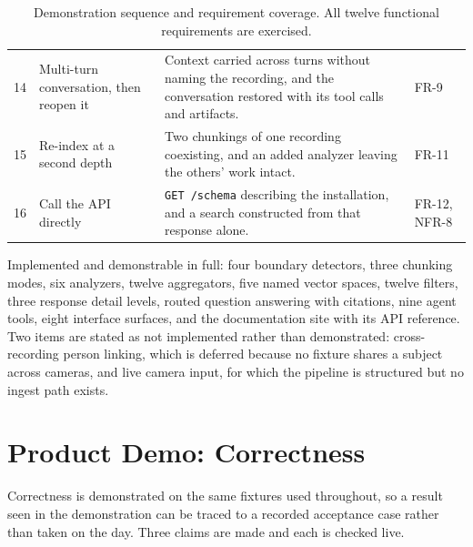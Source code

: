 \documentclass[11pt,a4paper]{article}
\begin{document}
\begin{table}[htbp]
\begin{tabularx}{\textwidth}{@{}L{0.7cm}L{3.4cm}XL{1.9cm}@{}}
14 & Multi-turn conversation, then reopen it & Context carried across turns without naming the recording, and the conversation restored with its tool calls and artifacts. & FR-9 \\
15 & Re-index at a second depth & Two chunkings of one recording coexisting, and an added analyzer leaving the others' work intact. & FR-11 \\
16 & Call the API directly & \texttt{GET /schema} describing the installation, and a search constructed from that response alone. & FR-12, NFR-8 \\
\bottomrule
\end{tabularx}
\caption{Demonstration sequence and requirement coverage. All twelve functional
requirements are exercised.}
\end{table}

Implemented and demonstrable in full: four boundary detectors, three chunking
modes, six analyzers, twelve aggregators, five named vector spaces, twelve
filters, three response detail levels, routed question answering with
citations, nine agent tools, eight interface surfaces, and the documentation
site with its API reference. Two items are stated as not implemented rather than
demonstrated: cross-recording person linking, which is deferred because no
fixture shares a subject across cameras, and live camera input, for which the
pipeline is structured but no ingest path exists.

\section{Product Demo: Correctness}

Correctness is demonstrated on the same fixtures used throughout, so a result
seen in the demonstration can be traced to a recorded acceptance case rather
than taken on the day. Three claims are made and each is checked live.
\end{document}
